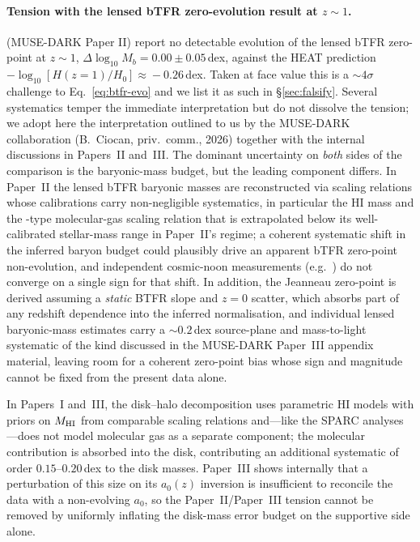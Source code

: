 \documentclass[twocolumn,letterpaper]{aastex631}
\newcommand{\azero}{a_0}
\begin{document}
\paragraph{Tension with the lensed bTFR zero-evolution result at
  $z\!\sim\!1$.}
\citet{Jeanneau2026} (MUSE-DARK Paper II) report no detectable
evolution of the lensed bTFR zero-point at $z\!\sim\!1$,
$\Delta\log_{10}M_{b}\!=\!0.00\!\pm\!0.05$\,dex, against the
HEAT prediction $-\log_{10}[H(z\!=\!1)/H_{0}]\!\approx\!-0.26$\,dex.
Taken at face value this is a $\sim 4\sigma$ challenge to
Eq.~\ref{eq:btfr-evo} and we list it as such in
\S\ref{sec:falsify}.  Several systematics temper the immediate
interpretation but do not dissolve the tension; we adopt here
the interpretation outlined to us by the MUSE-DARK collaboration
(B.~Ciocan, priv.\ comm., 2026) together with the internal
discussions in Papers~II and~III.  The dominant uncertainty on
\emph{both} sides of the comparison is the baryonic-mass budget,
but the leading component differs.  In Paper~II the lensed bTFR
baryonic masses are reconstructed via scaling relations whose
calibrations carry non-negligible systematics, in particular the
HI mass and the \citet{Tacconi2018}-type molecular-gas scaling
relation that is extrapolated below its
well-calibrated stellar-mass range in Paper~II's regime; a coherent systematic shift
in the inferred baryon budget could plausibly drive an apparent
bTFR zero-point non-evolution, and independent cosmic-noon
measurements (e.g.\ \citealt{Ubler2017}) do not converge on a
single sign for that shift.  In addition, the Jeanneau
zero-point is derived assuming a \emph{static} BTFR slope and
$z\!=\!0$ scatter, which absorbs part of any redshift dependence
into the inferred normalisation, and individual lensed
baryonic-mass estimates carry a $\sim 0.2$\,dex source-plane
and mass-to-light systematic of the kind discussed in the
MUSE-DARK Paper~III appendix material, leaving room for a
coherent zero-point bias whose sign and magnitude cannot be
fixed from the present data alone.

In Papers~I and~III, the disk--halo decomposition uses parametric
HI models with priors on $M_{\rm HI}$ from comparable scaling
relations and---like the SPARC analyses---does not model molecular
gas as a separate component; the molecular contribution is
absorbed into the disk, contributing an additional systematic of
order $0.15$--$0.20$\,dex to the disk masses.  Paper~III shows
internally that a perturbation of this size on its $\azero(z)$
inversion is insufficient to reconcile the data with a
non-evolving $\azero$, so the Paper~II/Paper~III tension cannot
be removed by uniformly inflating the disk-mass error budget on
the supportive side alone.
\end{document}
